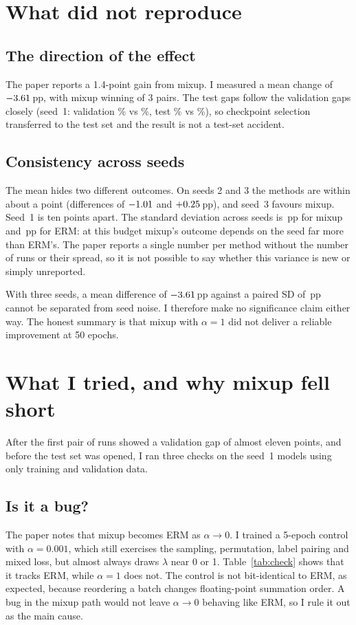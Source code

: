 \documentclass[conference]{IEEEtran}
\newcommand{\pp}{\,pp}
\begin{document}
\section{What did not reproduce}
\subsection{The direction of the effect}
The paper reports a 1.4-point gain from mixup. I measured a mean change of $-3.61$\pp{}, with
mixup winning \MixWins{} of 3 pairs. The test gaps follow the validation gaps closely (seed~1:
validation \MixValOne\% vs \ErmValOne\%, test \MixTestOne\% vs \ErmTestOne\%), so checkpoint
selection transferred to the test set and the result is not a test-set accident.

\subsection{Consistency across seeds}
The mean hides two different outcomes. On seeds 2 and 3 the methods are within about a point
(differences of $-1.01$ and $+0.25$\pp), and seed~3 favours mixup. Seed~1 is ten points apart.
The standard deviation across seeds is \MixSD\pp{} for mixup and \ErmSD\pp{} for ERM: at this budget
mixup's outcome depends on the seed far more than ERM's. The paper reports a single number per
method without the number of runs or their spread, so it is not possible to say whether this
variance is new or simply unreported.

With three seeds, a mean difference of $-3.61$\pp{} against a paired SD of \DiffSD\pp{} cannot
be separated from seed noise. I therefore make no significance claim either way. The honest summary
is that mixup with $\alpha=1$ did not deliver a reliable improvement at 50 epochs.

\section{What I tried, and why mixup fell short}
After the first pair of runs showed a validation gap of almost eleven points, and before the test set was
opened, I ran three checks on the seed~1 models using only training and validation data.

\subsection{Is it a bug?}
The paper notes that mixup becomes ERM as $\alpha\to0$. I trained a 5-epoch control with
$\alpha=0.001$, which still exercises the sampling, permutation, label pairing and mixed loss, but
almost always draws $\lambda$ near 0 or 1. Table~\ref{tab:check} shows that it tracks ERM, while
$\alpha=1$ does not. The control is not bit-identical to ERM, as expected, because reordering a
batch changes floating-point summation order. A bug in the mixup path would not leave $\alpha\to0$
behaving like ERM, so I rule it out as the main cause.
\end{document}
